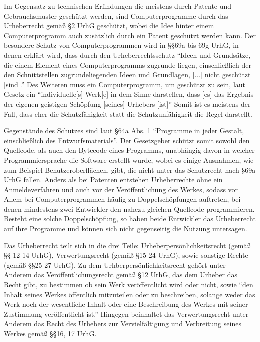 Im Gegensatz zu technischen Erfindungen die meistens durch Patente und Gebrauchsmuster geschützt werden, sind Computerprogramme durch das Urheberrecht gemäß §2 UrhG geschützt,
wobei die Idee hinter einem Computerprogramm auch zusätzlich durch ein Patent geschützt werden kann. Der besondere Schutz von Computerprogrammen wird in §§69a bis 69g UrhG, in denen erklärt wird,
dass durch den Urheberrechtsschutz “Ideen und Grundsätze, die einem Element eines Computerprogramms zugrunde liegen, einschließlich der den Schnittstellen zugrundeliegenden Ideen und Grundlagen,
[...] nicht geschützt [sind].”  Des Weiteren muss ein Computerprogramm, um geschützt zu sein, laut Gesetz ein “individuelle[s] Werk[e] in dem Sinne darstellen,
dass [es] das Ergebnis der eigenen geistigen Schöpfung [seines] Urhebers [ist]” Somit ist es meistens der Fall, dass eher die Schutzfähigkeit statt die Schutzunfähigkeit die Regel darstellt.

Gegenstände des Schutzes sind laut §64a Abs. 1 “Programme in jeder Gestalt, einschließlich des Entwurfsmaterials”. Der Gesetzgeber schützt somit sowohl den Quellcode,
als auch den Bytecode eines Programms, unabhängig davon in welcher Programmiersprache die Software erstellt wurde, wobei es einige Ausnahmen, wie zum Beispiel Benutzeroberflächen, gibt,
die nicht unter das Schutzrecht nach §69a UrhG fallen. Anders als bei Patenten entstehen Urheberrechte ohne ein Anmeldeverfahren und auch vor der Veröffentlichung des Werkes,
sodass vor Allem bei Computerprogrammen häufig zu Doppelschöpfungen auftreten, bei denen mindestens zwei Entwickler den nahezu gleichen Quellcode programmieren.
Besteht eine solche Doppelschöpfung, so haben beide Entwickler das Urheberrecht auf ihre Programme und können sich nicht gegenseitig die Nutzung untersagen.

Das Urheberrecht teilt sich in die drei Teile: Urheberpersönlichkeitsrecht (gemäß §§ 12-14 UrhG), Verwertungsrecht (gemäß §15-24 UrhG), sowie sonstige Rechte (gemäß §§25-27 UrhG).
Zu dem Urhberpersönlichkeitsrecht gehört unter Anderem das Veröffentlichungsrecht gemäß §12 UrhG, das dem Urheber das Recht gibt, zu bestimmen ob sein Werk veröffentlicht wird oder nicht,
sowie “den Inhalt seines Werkes öffentlich mitzuteilen oder zu beschreiben, solange weder das Werk noch der wesentliche Inhalt oder eine Beschreibung des Werkes mit seiner
Zustimmung veröffentlicht ist.” Hingegen beinhaltet das Verwertungsrecht unter Anderem das Recht des Urhebers zur Vervielfältigung und Verbreitung seines Werkes gemäß §§16, 17 UrhG.

